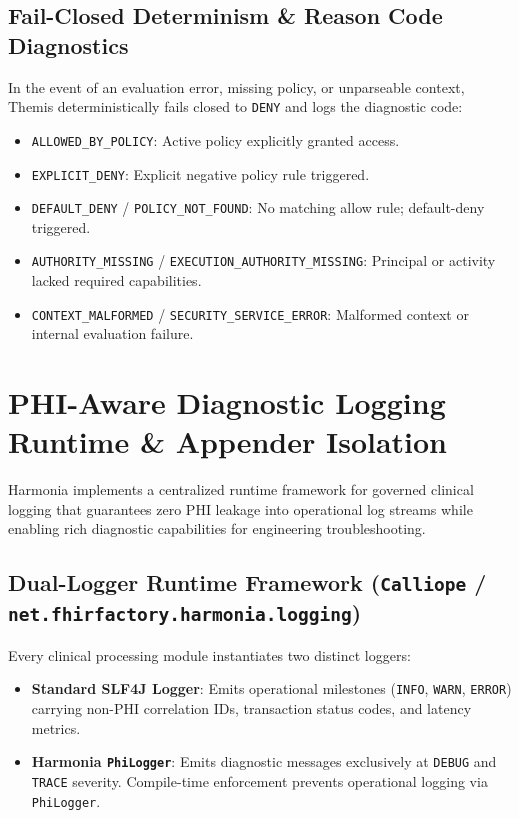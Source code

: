 \subsection{Fail-Closed Determinism \& Reason Code Diagnostics}
In the event of an evaluation error, missing policy, or unparseable context, Themis deterministically fails closed to \texttt{DENY} and logs the diagnostic code:
\begin{itemize}
    \item \texttt{ALLOWED\_BY\_POLICY}: Active policy explicitly granted access.
    \item \texttt{EXPLICIT\_DENY}: Explicit negative policy rule triggered.
    \item \texttt{DEFAULT\_DENY} / \texttt{POLICY\_NOT\_FOUND}: No matching allow rule; default-deny triggered.
    \item \texttt{AUTHORITY\_MISSING} / \texttt{EXECUTION\_AUTHORITY\_MISSING}: Principal or activity lacked required capabilities.
    \item \texttt{CONTEXT\_MALFORMED} / \texttt{SECURITY\_SERVICE\_ERROR}: Malformed context or internal evaluation failure.
\end{itemize}

\section{PHI-Aware Diagnostic Logging Runtime \& Appender Isolation}
\label{sec:phi_logging_tech_runtime}

Harmonia implements a centralized runtime framework for governed clinical logging that guarantees zero PHI leakage into operational log streams while enabling rich diagnostic capabilities for engineering troubleshooting.

\subsection{Dual-Logger Runtime Framework (\texttt{Calliope} / \texttt{net.fhirfactory.harmonia.logging})}
Every clinical processing module instantiates two distinct loggers:
\begin{itemize}
    \item \textbf{Standard SLF4J Logger}: Emits operational milestones (\texttt{INFO}, \texttt{WARN}, \texttt{ERROR}) carrying non-PHI correlation IDs, transaction status codes, and latency metrics.
    \item \textbf{Harmonia \texttt{PhiLogger}}: Emits diagnostic messages exclusively at \texttt{DEBUG} and \texttt{TRACE} severity. Compile-time enforcement prevents operational logging via \texttt{PhiLogger}.
\end{itemize}

